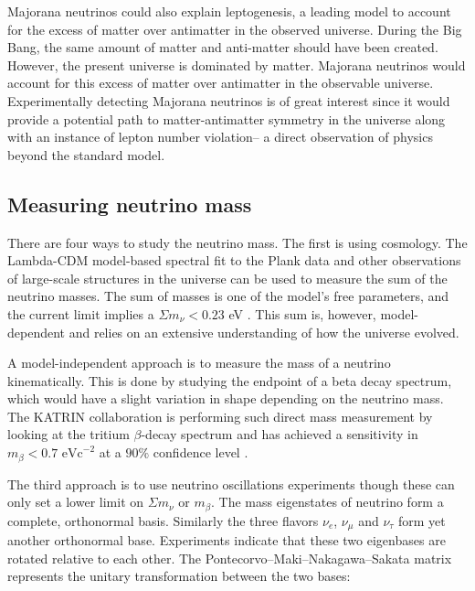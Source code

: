 Majorana neutrinos could also explain leptogenesis, a leading model to account for the excess of matter over antimatter in the observed universe. During the Big Bang, the same amount of matter and anti-matter should have been created. However, the present universe is dominated by matter. Majorana neutrinos would account for this excess of matter over antimatter in the observable universe. Experimentally detecting Majorana neutrinos is of great interest since it would provide a potential path to matter-antimatter symmetry in the universe along with an instance of lepton number violation-- a direct observation of physics beyond the standard model.

\subsection{Measuring neutrino mass}

There are four ways to study the neutrino mass. The first is using cosmology. The Lambda-CDM model-based spectral fit to the Plank data and other observations of large-scale structures in the universe can be used to measure the sum of the neutrino masses. The sum of masses is one of the model's free parameters, and the current limit implies a $\Sigma m_\nu<0.23$ eV \cite{Planck_2015fie}. This sum is, however, model-dependent and relies on an extensive understanding of how the universe evolved. 

A model-independent approach is to measure the mass of a neutrino kinematically. This is done by studying the endpoint of a beta decay spectrum, which would have a slight variation in shape depending on the neutrino mass. The KATRIN collaboration is performing such direct mass measurement by looking at the tritium $\beta$-decay spectrum and has achieved a sensitivity in $m_\beta < 0.7 \text{ eVc}^{-2}$ at a $90\%$ confidence level \cite{KATRIN:2022}.

The third approach is to use neutrino oscillations experiments though these can only set a lower limit on $\Sigma m_\nu$ or $m_\beta$. The mass eigenstates of neutrino form a complete, orthonormal basis. Similarly the three flavors $\nu_e$, $\nu_\mu$ and $\nu_\tau$ form yet another orthonormal base. Experiments indicate that these two eigenbases are rotated relative to each other. The Pontecorvo–Maki–Nakagawa–Sakata matrix represents the unitary transformation between the two bases:

